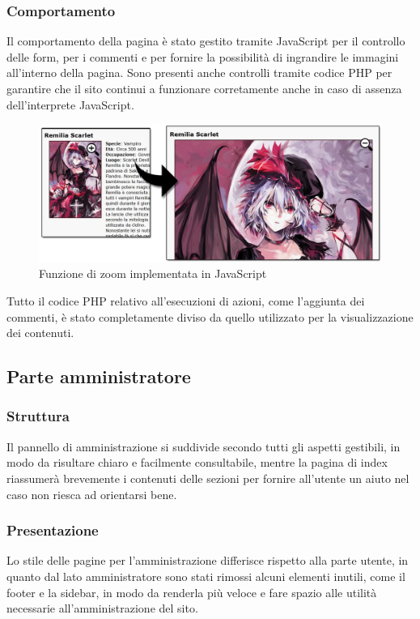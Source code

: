 \documentclass[openany, a4paper, 12pt]{report}
\begin{document}
			\subsubsection{Comportamento}
			Il comportamento della pagina è stato gestito tramite JavaScript per il controllo delle form, per i commenti e per fornire la possibilità di ingrandire le immagini all'interno della pagina. Sono presenti anche controlli tramite codice PHP per garantire che il sito continui a funzionare corretamente anche in caso di assenza dell'interprete JavaScript.
			
			\begin{figure}[H]
				\centering
				\includegraphics[width=0.8\linewidth]{images/zomm}
				\caption{Funzione di zoom implementata in JavaScript}
			\end{figure}
			
			Tutto il codice PHP relativo all'esecuzioni di azioni, come l'aggiunta dei commenti, è stato completamente diviso da quello utilizzato per la visualizzazione dei contenuti.\\

	\subsection{Parte amministratore}
		\subsubsection{Struttura}
		Il pannello di amministrazione si suddivide secondo tutti gli aspetti gestibili, in modo da risultare chiaro e facilmente consultabile, mentre la pagina di index riassumerà brevemente i contenuti delle sezioni per fornire all'utente un aiuto nel caso non riesca ad orientarsi bene.
		\subsubsection{Presentazione}
		Lo stile delle pagine per l'amministrazione differisce rispetto alla parte utente, in quanto dal lato amministratore sono stati rimossi alcuni elementi inutili, come il footer e la sidebar, in modo da renderla più veloce e fare spazio alle utilità necessarie all'amministrazione del sito.
\end{document}
